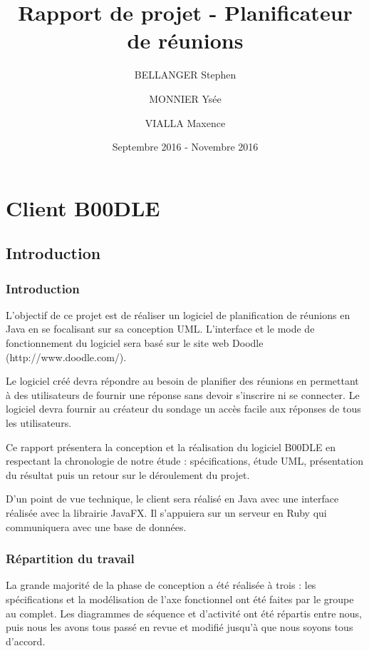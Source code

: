 \documentclass[titlepage]{report}
\title{Rapport de projet - Planificateur de réunions}
\author{BELLANGER Stephen \and
			MONNIER Ysée \and
			VIALLA Maxence}
\date{Septembre 2016 - Novembre 2016}
\begin{document}
	
	\maketitle


\tableofcontents

\listoffigures 
\part{Client B00DLE}

\chapter{Introduction}

\section{Introduction}

\par
L'objectif de ce projet est de réaliser un logiciel de planification de réunions en Java en se focalisant sur sa conception UML. 
L'interface et le mode de fonctionnement du logiciel sera basé sur le site web Doodle (http://www.doodle.com/). 
\par
Le logiciel créé devra répondre au besoin de planifier des réunions en permettant à des utilisateurs de fournir une réponse sans devoir s'inscrire ni se connecter. 
Le logiciel devra fournir au créateur du sondage un accès facile aux réponses de tous les utilisateurs.
\par
Ce rapport présentera la conception et la réalisation du logiciel B00DLE en respectant la chronologie de notre étude : spécifications, étude UML, présentation du résultat puis un retour sur le déroulement du projet.
\par D'un point de vue technique, le client sera réalisé en Java avec une interface réalisée avec la librairie JavaFX. Il s'appuiera sur un serveur en Ruby qui communiquera avec une base de données.

\section{Répartition du travail}

\par La grande majorité de la phase de conception a été réalisée à trois : les spécifications et la modélisation de l'axe fonctionnel ont été faites par le groupe au complet.
Les diagrammes de séquence et d'activité ont été répartis entre nous, puis nous les avons tous passé en revue et modifié jusqu'à que nous soyons tous d'accord.
\end{document}
